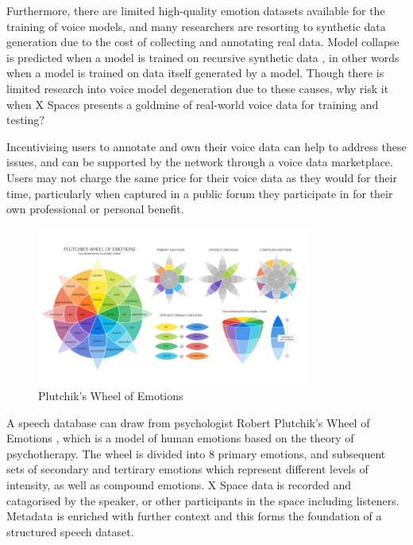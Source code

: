 \documentclass[11pt,a4paper]{article}
\begin{document}
Furthermore, there are limited high-quality emotion datasets available for the training of voice models, and many researchers are resorting to synthetic data generation due to the cost of collecting and annotating real data.
Model collapse is predicted when a model is trained on recursive synthetic data \cite{shumailov2024model}, in other words when a model is trained on data itself generated by a model.
Though there is limited research into voice model degeneration due to these causes, why risk it when X Spaces presents a goldmine of real-world voice data for training and testing?

Incentivising users to annotate and own their voice data can help to address these issues, and can be supported by the network through a voice data marketplace.
Users may not charge the same price for their voice data as they would for their time, particularly when captured in a public forum they participate in for their own professional or personal benefit.

\begin{figure}[H]
    \centering
    \includegraphics[width=0.8\textwidth]{wheel.png}
    \caption{Plutchik's Wheel of Emotions}
    \label{fig:emotion-wheel-png}
\end{figure}

A speech database can draw from psychologist Robert Plutchik's Wheel of Emotions \cite{plutchik1980general}, which is a model of human emotions based on the theory of psychotherapy.
The wheel is divided into 8 primary emotions, and subsequent sets of secondary and tertirary emotions which represent different levels of intensity, as well as compound emotions.
X Space data is recorded and catagorised by the speaker, or other participants in the space including listeners. Metadata is enriched with further context and this forms the foundation of a structured speech dataset.
\end{document}
